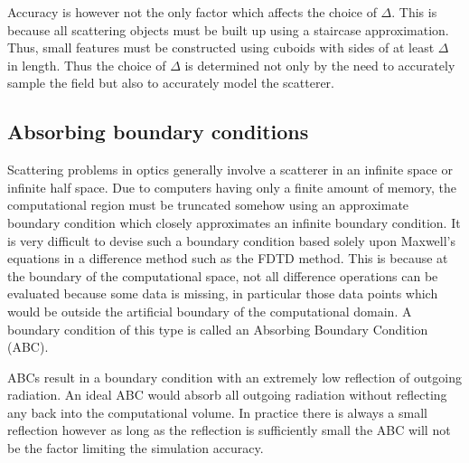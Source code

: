 \documentclass[a4paper, 12pt]{article}
\begin{document}
	Accuracy is however not the only factor which affects the choice of
	$\Delta$. This is because all scattering objects must be built up
	using a staircase approximation. Thus, small features must be
	constructed using cuboids with sides of at least $\Delta$ in
	length. Thus the choice of $\Delta$ is determined not only by the need
	to accurately sample the field but also to accurately model the scatterer.
	\subsection{Absorbing boundary conditions}
	\label{sec:fdtd:abcpml}
	Scattering problems in
	optics generally involve a scatterer in an infinite space or infinite
	half space. Due to computers having only a finite amount of memory,
	the computational region must be truncated somehow using an approximate
	boundary condition which closely approximates an infinite boundary
	condition. It is very difficult to devise such a boundary
	condition based solely upon Maxwell's equations in a difference method
	such as the FDTD method. This is because at the boundary of the
	computational space, not all difference operations can be evaluated
	because some data is missing, in particular those data points which
	would be outside the artificial boundary of the computational
	domain. A boundary condition of this type is called an Absorbing Boundary Condition (ABC).

	ABCs result in a boundary condition with an extremely low reflection
	of outgoing radiation. An ideal ABC would absorb all outgoing
	radiation without reflecting any back into the computational
	volume. In practice there is always a small reflection however as long
	as the reflection is sufficiently small the ABC will not be the factor
	limiting the simulation accuracy.
\end{document}
